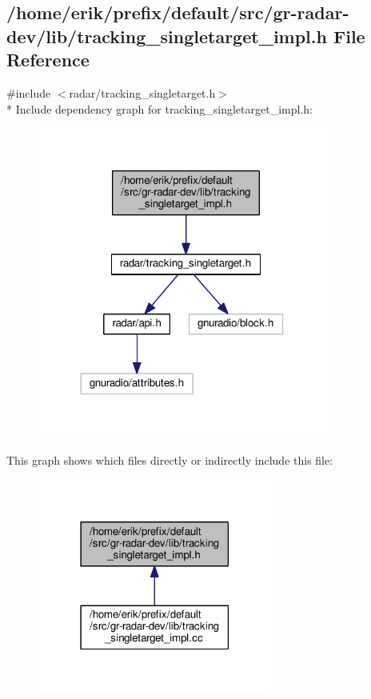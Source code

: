 \subsection{/home/erik/prefix/default/src/gr-\/radar-\/dev/lib/tracking\+\_\+singletarget\+\_\+impl.h File Reference}
\label{tracking__singletarget__impl_8h}
{\ttfamily \#include $<$radar/tracking\+\_\+singletarget.\+h$>$}\\*
Include dependency graph for tracking\+\_\+singletarget\+\_\+impl.\+h\+:
\nopagebreak
\begin{figure}[H]
\begin{center}
\leavevmode
\includegraphics[width=270pt]{df/dd8/tracking__singletarget__impl_8h__incl}
\end{center}
\end{figure}
This graph shows which files directly or indirectly include this file\+:
\nopagebreak
\begin{figure}[H]
\begin{center}
\leavevmode
\includegraphics[width=218pt]{da/d53/tracking__singletarget__impl_8h__dep__incl}
\end{center}
\end{figure}
